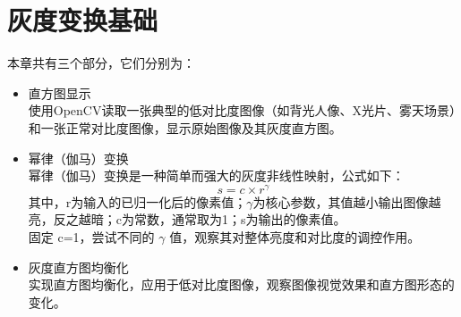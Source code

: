 \documentclass[11pt]{article}
\begin{document}
	\newpage
    
    \section{灰度变换基础}
    本章共有三个部分，它们分别为：
    \begin{itemize}
    	\item 直方图显示\\
    	使用OpenCV读取一张典型的低对比度图像（如背光人像、X光片、雾天场景）和一张正常对比度图像，显示原始图像及其灰度直方图。
    	\item 幂律（伽马）变换\\
    	幂律（伽马）变换是一种简单而强大的灰度非线性映射，公式如下：
    		$$s = c \times r ^ γ$$
    	其中，r为输入的已归一化后的像素值；$\gamma$为核心参数，其值越小输出图像越亮，反之越暗；c为常数，通常取为1；s为输出的像素值。\\
    	固定 c=1，尝试不同的 $\gamma$ 值，观察其对整体亮度和对比度的调控作用。
    	\item 灰度直方图均衡化\\
    	实现直方图均衡化，应用于低对比度图像，观察图像视觉效果和直方图形态的变化。
    \end{itemize}
    
\end{document}
